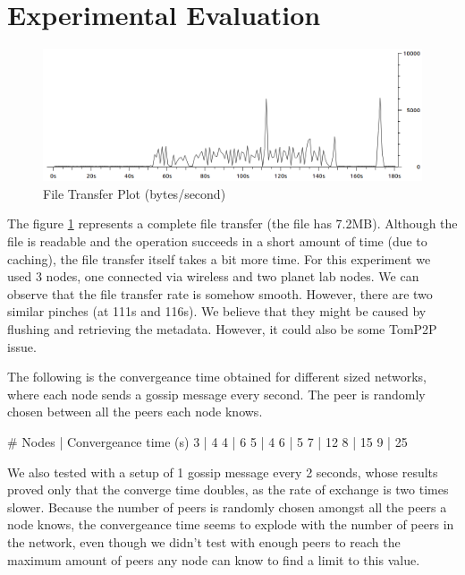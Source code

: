 \documentclass[times,9pt,article]{llncs}
\begin{document}
\section{Experimental Evaluation}

\begin{figure}
\centering
\includegraphics[keepaspectratio,width=1\textwidth]{images/file_transfer.png}
\caption{File Transfer Plot (bytes/second)}
\label{fig:file_transfer}
\end{figure}

The figure \ref{fig:file_transfer} represents a complete file transfer (the file has 7.2MB). Although the file is readable and the operation succeeds in a short amount of time (due to caching), the file transfer itself takes a bit more time. For this experiment we used 3 nodes, one connected via wireless and two planet lab nodes. We can observe that the file transfer rate is somehow smooth. However, there are two similar pinches (at 111s and 116s). We believe that they might be caused by flushing and retrieving the metadata. However, it could also be some TomP2P issue.

The following is the convergeance time obtained for different sized networks, where each node sends a gossip message every second. The peer is randomly chosen between all the peers each node knows.

# Nodes | Convergeance time (s)
3 | 4
4 | 6
5 | 4
6 | 5
7 | 12
8 | 15
9 | 25

We also tested with a setup of 1 gossip message every 2 seconds, whose results proved only that the converge time doubles, as the rate of exchange is two times slower.
Because the number of peers is randomly chosen amongst all the peers a node knows, the convergeance time seems to explode with the number of peers in the network, even though we didn't test with enough peers to reach the maximum amount of peers any node can know to find a limit to this value.
\end{document}
